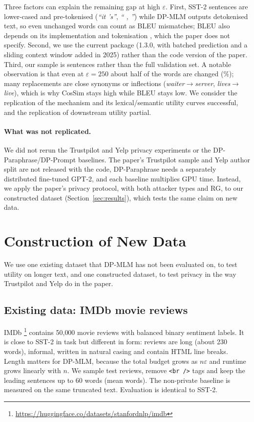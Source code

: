 \documentclass[11pt]{article}
\begin{document}
Three factors can explain the remaining gap at high $\varepsilon$. First, SST-2 sentences are lower-cased and pre-tokenised (\emph{``it 's''}, \emph{`` , ''}) while DP-MLM outputs detokenised text, so even unchanged words can count as BLEU mismatches; BLEU also depends on its implementation and tokenisation \citep{post-2018-call}, which the paper does not specify. Second, we use the current package (1.3.0, with batched prediction and a sliding context window added in 2025) rather than the code version of the paper. Third, our sample is \NSST{} sentences rather than the full validation set. A notable observation is that even at $\varepsilon=250$ about half of the words are changed (\SSTChgTwoFifty\%); many replacements are close synonyms or inflections (\emph{waiter}$\rightarrow$\emph{server}, \emph{lives}$\rightarrow$\emph{live}), which is why CosSim stays high while BLEU stays low. We consider the replication of the mechanism and its lexical/semantic utility curves successful, and the replication of downstream utility partial.

\paragraph{What was not replicated.} We did not rerun the Trustpilot and Yelp privacy experiments or the DP-Paraphrase/DP-Prompt baselines. The paper's Trustpilot sample and Yelp author split are not released with the code, DP-Paraphrase needs a separately distributed fine-tuned GPT-2, and each baseline multiplies GPU time. Instead, we apply the paper's privacy protocol, with both attacker types and RG, to our constructed dataset (Section~\ref{sec:results}), which tests the same claim on new data.

\section{Construction of New Data}
\label{sec:newdata}
We use one existing dataset that DP-MLM has not been evaluated on, to test utility on longer text, and one constructed dataset, to test privacy in the way Trustpilot and Yelp do in the paper.

\subsection{Existing data: IMDb movie reviews}
IMDb \citep{maas-etal-2011-learning}\footnote{\url{https://huggingface.co/datasets/stanfordnlp/imdb}} contains 50{,}000 movie reviews with balanced binary sentiment labels. It is close to SST-2 in task but different in form: reviews are long (about 230 words), informal, written in natural casing and contain HTML line breaks. Length matters for DP-MLM, because the total budget grows as $n\varepsilon$ and runtime grows linearly with $n$. We sample \NIMDB{} test reviews, remove \texttt{<br />} tags and keep the leading sentences up to 60 words (mean \IMDBLen{} words). The non-private baseline is measured on the same truncated text. Evaluation is identical to SST-2.
\end{document}
